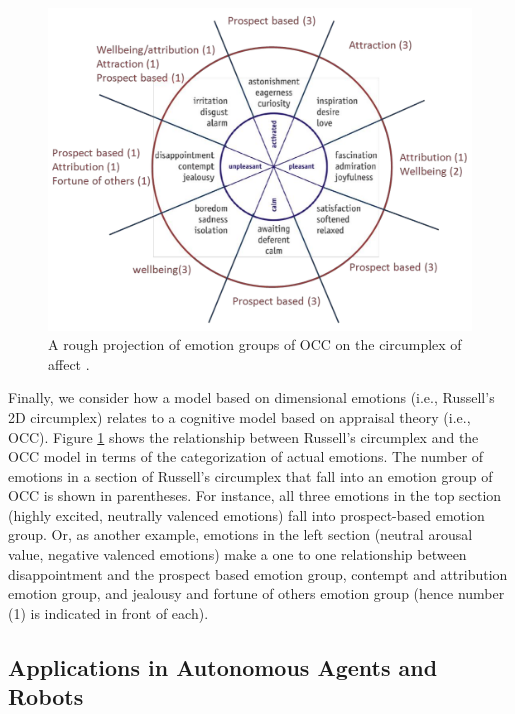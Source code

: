 \documentclass[12pt]{report}
\begin{document}
\begin{figure}[t]
  \center
  \includegraphics[width=.9\textwidth]{figure/occ-circumplex-mapping.png}
  \caption{A rough projection of emotion groups of OCC on the circumplex of
  affect \cite{ahmadpour:occ-dimensional-comparison}.}
  \label{fig:occ-circumplex}
\end{figure}

Finally, we consider how a model based on dimensional emotions (i.e., Russell's
2D circumplex) relates to a cognitive model based on appraisal theory (i.e.,
OCC). Figure \ref{fig:occ-circumplex} shows the relationship between Russell's
circumplex and the OCC model in terms of the categorization of actual emotions.
The number of emotions in a section of Russell's circumplex that fall into an
emotion group of OCC is shown in parentheses. For instance, all three emotions
in the top section (highly excited, neutrally valenced emotions) fall into
prospect-based emotion group. Or, as another example, emotions in the left
section (neutral arousal value, negative valenced emotions) make a one to one
relationship between disappointment and the prospect based emotion group,
contempt and attribution emotion group, and jealousy and fortune of others
emotion group (hence number (1) is indicated in front of each).

\subsection{Applications in Autonomous Agents and Robots}
\label{sec:applications}
\end{document}
